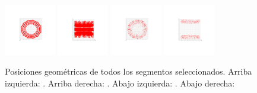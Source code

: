 \begin{figure}
\centering
\includegraphics[width=0.2\textwidth]{figures/Hits_DT_xy_postCleaning.png}
\includegraphics[width=0.2\textwidth]{figures/Hits_DT_xz_boarders.png}
\includegraphics[width=0.2\textwidth]{figures/Hits_CSC_xy_boarders.png}
\includegraphics[width=0.2\textwidth]{figures/Hits_CSC_xz_boarders.png}
\caption{Posiciones geom\'etricas de todos los segmentos seleccionados. Arriba izquierda: . Arriba derecha: . Abajo izquierda: . Abajo derecha: }
\label{fig:segments_pos}
\end{figure}


